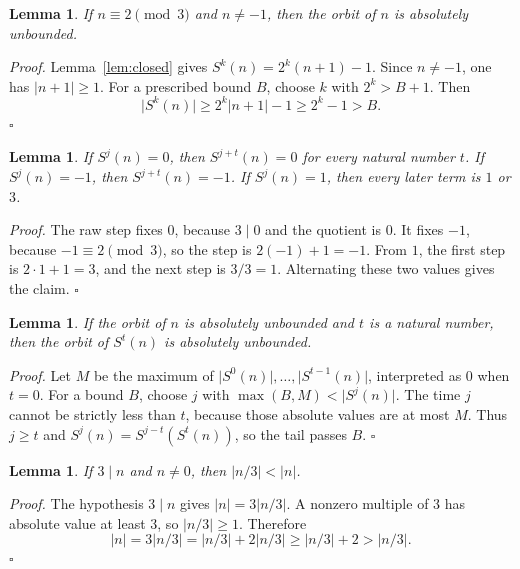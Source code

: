 \documentclass[11pt,letterpaper]{article}
\newtheorem{lemma}[theorem]{Lemma}
\newenvironment{proof}{\noindent\textit{Proof.}}{\hfill\(\square\)}
\begin{document}
\begin{lemma}
\label{lem:grow}
If \(n\equiv 2\pmod{3}\) and \(n\neq -1\), then the orbit of \(n\) is absolutely unbounded.
\end{lemma}

\begin{proof}
Lemma~\ref{lem:closed} gives \(S^{k}(n)=2^{k}(n+1)-1\). Since \(n\neq -1\), one has \(\lvert n+1\rvert\ge 1\). For a prescribed bound \(B\), choose \(k\) with \(2^{k}>B+1\). Then
\[
  \lvert S^{k}(n)\rvert
  \ge 2^{k}\lvert n+1\rvert-1
  \ge 2^{k}-1
  >B.
\]
\end{proof}

\begin{lemma}
\label{lem:tails}
If \(S^{j}(n)=0\), then \(S^{j+t}(n)=0\) for every natural number \(t\). If \(S^{j}(n)=-1\), then \(S^{j+t}(n)=-1\). If \(S^{j}(n)=1\), then every later term is \(1\) or \(3\).
\end{lemma}

\begin{proof}
The raw step fixes \(0\), because \(3\mid 0\) and the quotient is \(0\). It fixes \(-1\), because \(-1\equiv 2\pmod{3}\), so the step is \(2(-1)+1=-1\). From \(1\), the first step is \(2\cdot 1+1=3\), and the next step is \(3/3=1\). Alternating these two values gives the claim.
\end{proof}

\begin{lemma}
\label{lem:drop}
If the orbit of \(n\) is absolutely unbounded and \(t\) is a natural number, then the orbit of \(S^{t}(n)\) is absolutely unbounded.
\end{lemma}

\begin{proof}
Let \(M\) be the maximum of \(\lvert S^{0}(n)\rvert,\ldots,\lvert S^{t-1}(n)\rvert\), interpreted as \(0\) when \(t=0\). For a bound \(B\), choose \(j\) with \(\max(B,M)<\lvert S^{j}(n)\rvert\). The time \(j\) cannot be strictly less than \(t\), because those absolute values are at most \(M\). Thus \(j\ge t\) and \(S^{j}(n)=S^{j-t}(S^{t}(n))\), so the tail passes \(B\).
\end{proof}

\begin{lemma}
\label{lem:quot}
If \(3\mid n\) and \(n\neq 0\), then \(\lvert n/3\rvert<\lvert n\rvert\).
\end{lemma}

\begin{proof}
The hypothesis \(3\mid n\) gives \(\lvert n\rvert=3\lvert n/3\rvert\). A nonzero multiple of \(3\) has absolute value at least \(3\), so \(\lvert n/3\rvert\ge 1\). Therefore
\[
  \lvert n\rvert=3\lvert n/3\rvert=\lvert n/3\rvert+2\lvert n/3\rvert
  \ge\lvert n/3\rvert+2>\lvert n/3\rvert.
\]
\end{proof}
\end{document}
